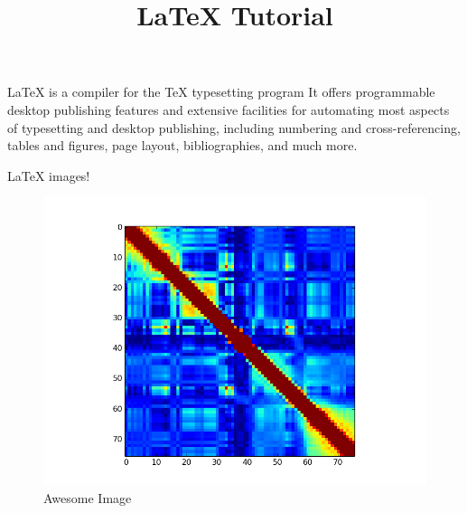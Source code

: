 \documentclass[12pt]{article}
\title{\LaTeX{} Tutorial}
\begin{document}
  \maketitle
  \LaTeX{} is a compiler for the \TeX{} typesetting program
  It offers programmable desktop publishing features and extensive facilities for
  automating most aspects of typesetting and desktop
  publishing, including numbering and cross-referencing,
  tables and figures, page layout, bibliographies, and
  much more.
 

  \LaTeX{} images!

  \begin{figure}[h]
    \centering
    \includegraphics[height=0.5\textwidth]{images/fancy_figure.png}
    \caption{Awesome Image}
    \label{fig:awesome_image}
  \end{figure}
\end{document}
